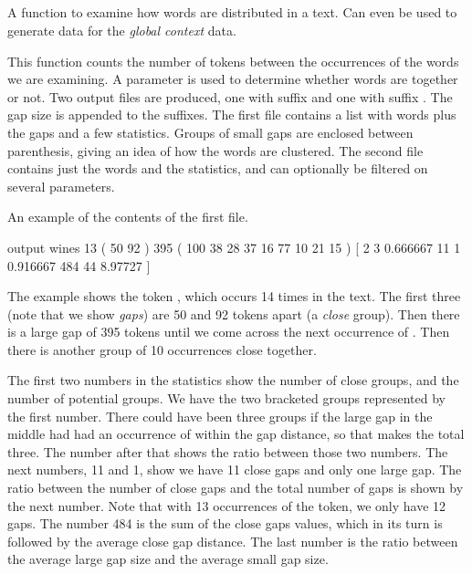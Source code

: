 \documentclass[a4paper,10pt,twoside]{report}
\begin{document}
\subsection{}

A function to examine how words are distributed in a text. Can even be
used to generate data for the \emph{global context} data.

This function counts the number of tokens between the occurrences of
the words we are examining. A  parameter is used to determine
whether words are  together or not. Two output files are
produced, one with suffix  and one with suffix . The
gap size is appended to the suffixes. The first file contains a list
with words plus the gaps and a few statistics. Groups of small gaps
are enclosed between parenthesis, giving an idea of how the words are
clustered. The second file contains just the words and the statistics,
and can optionally be filtered on several parameters.

An example of the contents of the first file.

\begin{wout}{ output}
wines 13 ( 50 92 ) 395 ( 100 38 28 37 16 77 10 21 15 )
                            [ 2 3 0.666667 11 1 0.916667 484 44 8.97727 ]
\end{wout}

The example shows the token , which occurs \num{14} times
in the text. The first three (note that we show \emph{gaps}) are
\num{50} and \num{92} tokens apart (a \emph{close} group). Then there
is a large gap of \num{395} tokens until we come across the next
occurrence of . Then there is another group of \num{10}
occurrences close together.

The first two numbers in the statistics show the number of close
groups, and the number of potential groups. We have the two bracketed
groups represented by the first number. There could have been three
groups if the large gap in the middle had had an occurrence of
 within the gap distance, so that makes the total
three. The number after that shows the ratio between those two
numbers. The next numbers, \num{11} and \num{1}, show we have \num{11}
close gaps and only one large gap. The ratio between the number of
close gaps and the total number of gaps is shown by the next
number. Note that with \num{13} occurrences of the token, we only have
\num{12} gaps. The number \num{484} is the sum of the close gaps
values, which in its turn is followed by the average close gap
distance. The last number is the ratio between the average large gap
size and the average small gap size.
\end{document}
